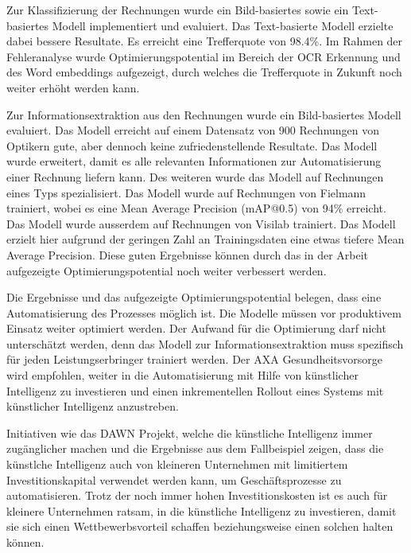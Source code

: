 {    Zur Klassifizierung der Rechnungen wurde ein Bild-basiertes sowie ein Text-basiertes Modell implementiert und evaluiert. Das Text-basierte Modell erzielte dabei bessere Resultate. Es erreicht eine Trefferquote von 98.4\%. Im Rahmen der Fehleranalyse wurde Optimierungspotential im Bereich der OCR Erkennung und des Word embeddings aufgezeigt, durch welches die Trefferquote in Zukunft noch weiter erhöht werden kann.
    
    Zur Informationsextraktion aus den Rechnungen wurde ein Bild-basiertes Modell evaluiert. Das Modell erreicht auf einem Datensatz von 900 Rechnungen von Optikern gute, aber dennoch keine zufriedenstellende Resultate. Das Modell wurde erweitert, damit es alle relevanten Informationen zur Automatisierung einer Rechnung liefern kann. Des weiteren wurde das Modell auf Rechnungen eines Typs spezialisiert. Das Modell wurde auf Rechnungen von Fielmann trainiert, wobei es eine Mean Average Precision (mAP@0.5) von 94\% erreicht. Das Modell wurde ausserdem auf Rechnungen von Visilab trainiert. Das Modell erzielt hier aufgrund der geringen Zahl an Trainingsdaten eine etwas tiefere Mean Average Precision. Diese guten Ergebnisse können durch das in der Arbeit aufgezeigte Optimierungspotential noch weiter verbessert werden. 
    
    Die Ergebnisse und das aufgezeigte Optimierungspotential belegen, dass eine Automatisierung des Prozesses möglich ist. Die Modelle müssen vor produktivem Einsatz weiter optimiert werden. Der Aufwand für die Optimierung darf nicht unterschätzt werden, denn das Modell zur Informationsextraktion muss spezifisch für jeden Leistungserbringer trainiert werden. Der AXA Gesundheitsvorsorge wird empfohlen, weiter in die Automatisierung mit Hilfe von künstlicher Intelligenz zu investieren und einen inkrementellen Rollout eines Systems mit künstlicher Intelligenz anzustreben.
    
    Initiativen wie das DAWN Projekt, welche die künstliche Intelligenz immer zugänglicher machen und die Ergebnisse aus dem Fallbeispiel zeigen, dass die künstlche Intelligenz auch von kleineren Unternehmen mit limitiertem Investitionskapital verwendet werden kann, um Geschäftsprozesse zu automatisieren. Trotz der noch immer hohen Investitionskosten ist es auch für kleinere Unternehmen ratsam, in die künstliche Intelligenz zu investieren, damit sie sich einen Wettbewerbsvorteil schaffen beziehungsweise einen solchen halten können.
}

\newpage
\null
\cleardoublepage

\renewcommand{\baselinestretch}{1.05}
\tableofcontents
\renewcommand{\baselinestretch}{1.15}

\newpage
\null
\cleardoublepage
{}
\cleardoublepage


